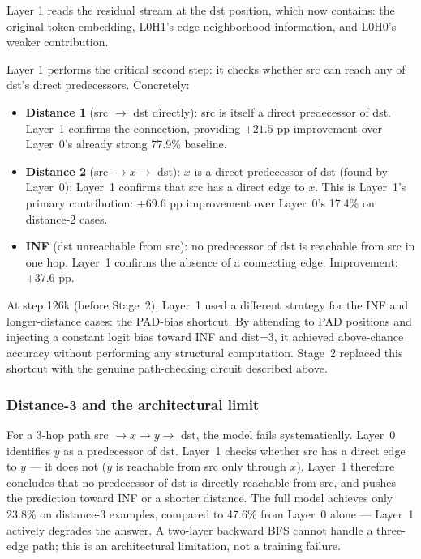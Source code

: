 \documentclass[11pt, a4paper]{article}
\begin{document}
Layer 1 reads the residual stream at the dst position, which now contains:
the original token embedding, L0H1's edge-neighborhood information, and
L0H0's weaker contribution.

Layer 1 performs the critical second step: it checks whether src can reach
any of dst's direct predecessors.  Concretely:

\begin{itemize}[noitemsep]
  \item \textbf{Distance 1} (src $\to$ dst directly): src is itself a direct
    predecessor of dst.  Layer~1 confirms the connection, providing $+21.5$ pp
    improvement over Layer~0's already strong 77.9\% baseline.
  \item \textbf{Distance 2} (src $\to x \to$ dst): $x$ is a direct
    predecessor of dst (found by Layer~0); Layer~1 confirms that src has a
    direct edge to $x$.  This is Layer~1's primary contribution: $+69.6$ pp
    improvement over Layer~0's 17.4\% on distance-2 cases.
  \item \textbf{INF} (dst unreachable from src): no predecessor of dst is
    reachable from src in one hop.  Layer~1 confirms the absence of a
    connecting edge.  Improvement: $+37.6$ pp.
\end{itemize}

At step 126k (before Stage~2), Layer~1 used a different strategy for the INF
and longer-distance cases: the PAD-bias shortcut.  By attending to PAD
positions and injecting a constant logit bias toward INF and dist=3, it
achieved above-chance accuracy without performing any structural computation.
Stage~2 replaced this shortcut with the genuine path-checking circuit
described above.

\subsubsection*{Distance-3 and the architectural limit}

For a 3-hop path src $\to x \to y \to$ dst, the model fails systematically.
Layer~0 identifies $y$ as a predecessor of dst.  Layer~1 checks whether src
has a direct edge to $y$ --- it does not ($y$ is reachable from src only
through $x$).  Layer~1 therefore concludes that no predecessor of dst is
directly reachable from src, and pushes the prediction toward INF or a
shorter distance.  The full model achieves only 23.8\% on distance-3 examples,
compared to 47.6\% from Layer~0 alone --- Layer~1 actively degrades the
answer.  A two-layer backward BFS cannot handle a three-edge path; this is
an architectural limitation, not a training failure.
\end{document}
